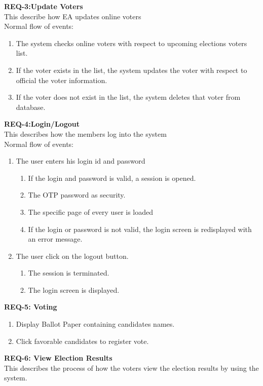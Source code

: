 \documentclass[12pt,a4paper,oneside]{report}
\begin{document}
\textbf{ REQ-3:Update Voters}\\                    
             This describe how EA updates online voters \\
    Normal flow of events: 
    \begin{enumerate}
    \item  The system checks online voters with respect to upcoming elections voters list.
    \item If the voter exists in the list, the system updates the voter with respect to official the voter information.
    \item If the voter does not exist in the list, the system deletes that voter from database.                  
    \end{enumerate}    
\textbf{REQ-4:Login/Logout} \\
This describes how the members log into the system \\
 Normal flow of events:
 \begin{enumerate}
 \item The user enters his login id and password
 \begin{enumerate}
 \item If the login and password is valid, a session is opened. 
 \item  The OTP password as  security. 
 \item The specific page of every user is loaded
  \item If the login or password is not valid, the login screen is redisplayed with an error message.
 \end{enumerate}
 \item The user click on the logout button.
 \begin{enumerate}
 \item The session is terminated.
 \item  The login screen is displayed.
\end{enumerate}   
\end{enumerate} 
\textbf{REQ-5: Voting }
    \begin{enumerate}
    \item Display Ballot Paper containing candidates names.
    \item Click favorable candidates to register vote.
    \end{enumerate}
\newpage
\textbf{REQ-6: View Election Results }\\
This describes the process of how the voters view the election results by using the system.\\
\end{document}
